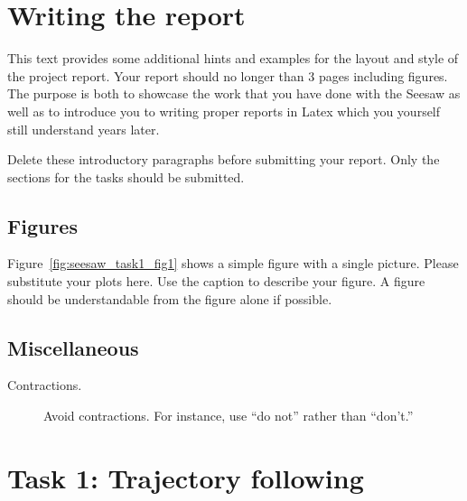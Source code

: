 \documentclass[12pt,a4paper,twocolumn]{article}
\begin{document}






\section*{Writing the report}

This text provides some additional hints and examples for the
layout and style of the project report. Your report should no longer than 3 pages including figures. The purpose is both to showcase the work that you have done with the Seesaw as well as to introduce you to writing proper reports in Latex which you yourself still understand years later. 

Delete these introductory paragraphs before submitting your report. Only the sections for the tasks should be submitted. 

\subsection*{Figures}

Figure~\ref{fig:seesaw_task1_fig1} shows a simple figure with a single picture. Please substitute your plots here. Use the caption to describe your figure. A figure should be understandable from the figure alone if possible. 


\subsection*{Miscellaneous}

\begin{description}

\item[Contractions.] Avoid contractions. For instance, use ``do not''
  rather than ``don't.''

\end{description}


\section*{Task 1: Trajectory following}
\label{s:task_1}
\end{document}
